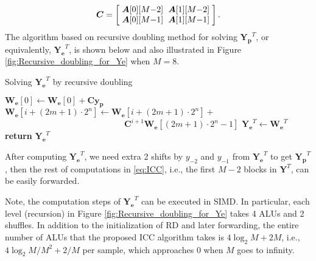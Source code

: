 \begin{equation*}
        \bm{C} = \left[\arraycolsep=3.0pt\def\arraystretch{1.0}
            \begin{array}{cc}
            \bm{A}[0][M{-}2] & \bm{A}[1][M{-}2] \\ 
            \bm{A}[0][M{-}1] & \bm{A}[1][M{-}1] \\ 
            \end{array}\right].
\end{equation*}
The algorithm based on recursive doubling method for solving $\bm{Y_p}^T$, or equivalently, $\bm{Y_e}^T$, is shown below
and also illustrated in Figure \ref{fig:Recursive_doubling_for_Ye} when $M=8$.

\begin{algorithm}
    \caption{Solving $\bm{Y_e}^T$ by recursive doubling}\label{recursive_doubling}
    \begin{algorithmic}[1]
            \State $\bm{W_e}[0] \gets \bm{W_e}[0] + \bm{C}\bm{y_p}$ 
              
                 
                     
                            \State $\bm{W_e}[i{+}(2m{+}1){\cdot}2^{n}] \gets \bm{W_e}[i{+}(2m{+}1){\cdot}2^{n}] + $ 
                            \Statex $ \quad\quad\quad\quad\quad\quad\quad\quad\quad\quad\quad\quad\quad\quad \bm{C}^{i{+}1} \bm{W_e}[(2m{+}1){\cdot}2^n{-}1]$ 
                    \EndFor
                \EndFor
            \EndFor
            \State $\bm{Y_e}^T \gets \bm{W_e}^T$
            \State \textbf{return} $\bm{Y_e}^T$ 
        \EndProcedure
    \end{algorithmic}
\end{algorithm}
After computing $\bm{Y_e}^T$, we need extra 2 shifts by $y_{-2}$ and $y_{-1}$ from $\bm{Y_e}^T$ to get $\bm{Y_p}^T$,
then the rest of computations in \eqref{eq:ICC}, i.e., the first $M{-}2$ blocks in $\bm{Y}^T$, can be easily forwarded. 

Note, the computation steps of $\bm{Y_e}^T$ can be executed in SIMD. In particular, each level (recursion)
in Figure \ref{fig:Recursive_doubling_for_Ye} takes 4 ALUs and 2 shuffles. In addition to the initialization of RD 
and later forwarding, the entire number of ALUs that the proposed ICC algorithm takes is $4\log_2M+2M$, i.e., $4\log_2M/M^2+2/M$ per sample, which approaches 0 when $M$ goes to infinity.

